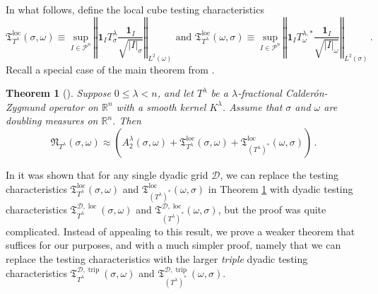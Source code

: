 \documentclass{amsart}%
\newtheorem{theorem}{Theorem}
\theoremstyle{plain}
\numberwithin{equation}{section}
\begin{document}
In what follows, define the local cube testing characteristics
\[
\mathfrak{T}_{T^{\lambda}}^{\operatorname{loc}}\left(  \sigma,\omega\right)
\equiv\sup_{I\in\mathcal{P}^{n}}\left\Vert \mathbf{1}_{I}T_{\sigma}^{\lambda
}\frac{\mathbf{1}_{I}}{\sqrt{\left\vert I\right\vert _{\sigma}}}\right\Vert
_{L^{2}\left(  \omega\right)  }\text{ and }\mathfrak{T}_{T^{\lambda}%
}^{\operatorname{loc}}\left(  \omega,\sigma\right)  \equiv\sup_{I\in
\mathcal{P}^{n}}\left\Vert \mathbf{1}_{I}T_{\omega}^{\lambda,\ast}%
\frac{\mathbf{1}_{I}}{\sqrt{\left\vert I\right\vert _{\omega}}}\right\Vert
_{L^{2}\left(  \sigma\right)  }\, .
\]
Recall a special case of the main theorem from \cite{AlSaUr}.

\begin{theorem}
[\cite{AlSaUr}]\label{main}Suppose $0\leq\lambda<n$, and let $T^{\lambda}$ be
a $\lambda$-fractional Calder\'{o}n-Zygmund operator on
$\mathbb{R}^{n}$ with a smooth kernel $K^{\lambda}$.
Assume that $\sigma$ and $\omega$ are doubling measures on $\mathbb{R}^{n}$. Then \begin{equation}
\mathfrak{N}_{T^{\lambda}}\left(  \sigma,\omega\right)  \approx \left(  A_{2}^{\lambda}\left(  \sigma,\omega\right)  +\mathfrak{T}%
_{T^{\lambda}}^{\operatorname{loc}}\left(  \sigma,\omega\right)
+\mathfrak{T}_{\left(  T^{\lambda}\right)  ^{\ast}}^{\operatorname{loc}%
}\left(  \omega,\sigma\right)  \right)  \label{bound} \,  .
\end{equation}
\end{theorem}

In \cite[Theorem 42]{AlLuSaUr} it was shown that for any single dyadic grid
$\mathcal{D}$, we can replace the testing characteristics $\mathfrak{T}%
_{T^{\lambda}}^{\operatorname{loc}}\left(  \sigma,\omega\right)  $ and
$\mathfrak{T}_{\left(  T^{\lambda}\right)  ^{\ast}}^{\operatorname{loc}%
}\left(  \omega,\sigma\right)  $ in Theorem \ref{main} with dyadic testing
characteristics $\mathfrak{T}_{T^{\lambda}}^{\mathcal{D},\operatorname{loc}%
}\left(  \sigma,\omega\right)  $ and $\mathfrak{T}_{\left(  T^{\lambda
}\right)  ^{\ast}}^{\mathcal{D},\operatorname{loc}}\left(  \omega
,\sigma\right)  $, but the proof was quite complicated. Instead of appealing
to this result, we prove a weaker theorem that suffices for our purposes,
and with a much simpler proof, namely that we can replace the testing
characteristics with the larger \emph{triple} dyadic testing characteristics
$\mathfrak{T}_{T^{\lambda}}^{\mathcal{D},\operatorname*{trip}}\left(
\sigma,\omega\right)  $ and $\mathfrak{T}_{\left(  T^{\lambda}\right)  ^{\ast
}}^{\mathcal{D},\operatorname*{trip}}\left(  \omega,\sigma\right)  $.
\end{document}
